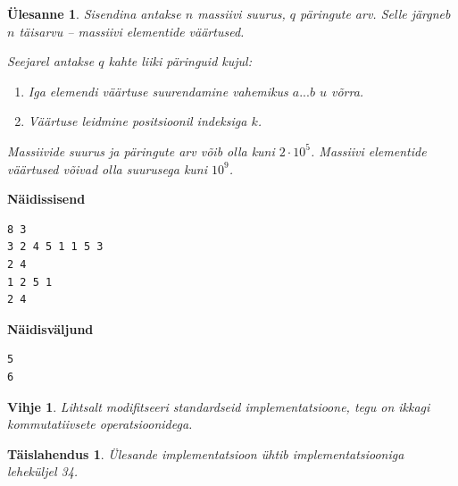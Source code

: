 \documentclass{trkut}
\newtheorem*{vihje}{Vihje}
\newtheorem*{solution}{Täislahendus}
\newtheorem*{Text}{Ülesanne}
\begin{document}
\begin{Text}
Sisendina antakse $n$ massiivi suurus, $q$ päringute arv. 
Selle järgneb $n$ täisarvu -- massiivi elementide väärtused.

Seejarel antakse $q$ kahte liiki päringuid kujul: 
\begin{enumerate}
\item Iga elemendi väärtuse suurendamine vahemikus $a...b$ $u$ võrra.
\item Väärtuse leidmine positsioonil indeksiga $k$.
\end{enumerate}

Massiivide suurus ja päringute arv võib olla kuni $2 \cdot 10^5$. Massiivi elementide väärtused võivad olla suurusega kuni $10^9$.

\parencite{update}
\end{Text}



\textbf{Näidissisend}

\begin{verbatim}
8 3
3 2 4 5 1 1 5 3
2 4
1 2 5 1
2 4
\end{verbatim}

\textbf{Näidisväljund}

\begin{verbatim}
5
6
\end{verbatim}


\begin{vihje}
Lihtsalt modifitseeri standardseid implementatsioone, tegu on ikkagi kommutatiivsete operatsioonidega.
\end{vihje}

\begin{solution}
Ülesande implementatsioon ühtib implementatsiooniga leheküljel 34.
\end{solution}
\end{document}
